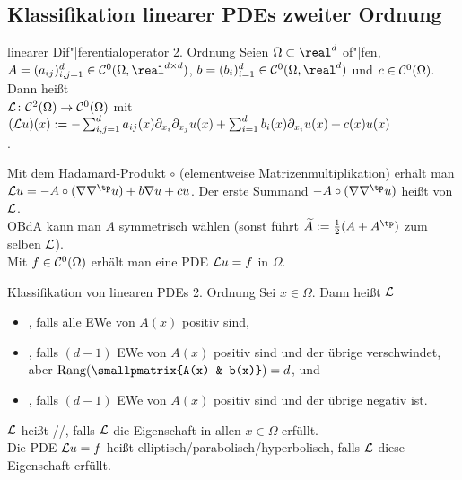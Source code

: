 \pagebreak

\subsection{%
    Klassifikation linearer PDEs zweiter Ordnung%
}

\begin{Def}{linearer Dif"|ferentialoperator 2. Ordnung}
    Seien $\Omega \subset \real^d$ of"|fen,\\
    $A = (a_{ij})_{i,j=1}^d \in \C^0(\Omega, \real^{d \times d})$,
    $b = (b_i)_{i=1}^d \in \C^0(\Omega, \real^d)$ und $c \in \mathcal{C}^0(\Omega)$.
    Dann heißt\\
    $\mathcal{L}\colon \mathcal{C}^2(\Omega) \to \mathcal{C}^0(\Omega)$ mit
    $(\mathcal{L} u)(x) := -\sum_{i,j=1}^d a_{ij}(x) \partial_{x_i} \partial_{x_j} u(x) +
    \sum_{i=1}^d b_i(x) \partial_{x_i} u(x) + c(x) u(x)$\\
    .
\end{Def}

\begin{Bem}
    Mit dem Hadamard-Produkt $\circ$ (elementweise Matrizenmultiplikation) erhält man
    $\L u = -A \circ (\nabla \nabla^\tp u) + b \nabla u + cu$.
    Der erste Summand
    $-A \circ (\nabla \nabla^\tp u)$ heißt  von $\mathcal{L}$.\\
    OBdA kann man $A$ symmetrisch wählen (sonst führt $\widetilde{A} := \frac{1}{2} (A + A^\tp)$
    zum selben $\mathcal{L}$).\\
    Mit $f \in \mathcal{C}^0(\Omega)$ erhält man eine PDE $\mathcal{L} u = f$ in $\Omega$.
\end{Bem}

\linie

\begin{Def}{Klassifikation von linearen PDEs 2. Ordnung}
    Sei $x \in \Omega$.
    Dann heißt $\mathcal{L}$
    \begin{itemize}
        \item
        ,
        falls alle EWe von $A(x)$ positiv sind,
        
        \item
        ,
        falls $(d - 1)$ EWe von $A(x)$ positiv sind und der übrige verschwindet,
        aber $\Rang(\smallpmatrix{A(x) & b(x)}) = d$, und
        
        \item
        ,
        falls $(d - 1)$ EWe von $A(x)$ positiv sind und der übrige negativ ist.
    \end{itemize}
    $\mathcal{L}$ heißt //,
    falls $\mathcal{L}$ die Eigenschaft in allen $x \in \Omega$ erfüllt.\\
    Die PDE $\mathcal{L} u = f$ heißt elliptisch/parabolisch/hyperbolisch,
    falls $\mathcal{L}$ diese Eigenschaft erfüllt.
\end{Def}

